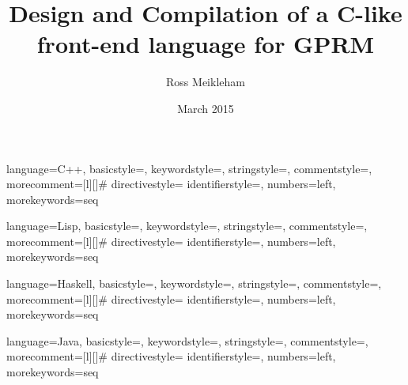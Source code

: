 \documentclass{l4proj}
\begin{document}
 {language=C++,
                basicstyle=\ttfamily,
                keywordstyle=\color{blue}\ttfamily,
                stringstyle=\color{red}\ttfamily,
                commentstyle=\color{gray}\ttfamily,
                morecomment=[l][\color{magenta}]{\#}
                directivestyle={\color{green}}
                identifierstyle=\color{purple},
                numbers=left,
                morekeywords={seq}
}


 {language=Lisp,
                basicstyle=\ttfamily,
                keywordstyle=\color{blue}\ttfamily,
                stringstyle=\color{red}\ttfamily,
                commentstyle=\color{gray}\ttfamily,
                morecomment=[l][\color{magenta}]{\#}
                directivestyle={\color{green}}
                identifierstyle=\color{purple},
                numbers=left,
                morekeywords={seq}
}

 {language=Haskell,
                basicstyle=\ttfamily,
                keywordstyle=\color{blue}\ttfamily,
                stringstyle=\color{red}\ttfamily,
                commentstyle=\color{gray}\ttfamily,
                morecomment=[l][\color{magenta}]{\#}
                directivestyle={\color{green}}
                identifierstyle=\color{purple},
                numbers=left,
                morekeywords={seq}
}

 {language=Java,
                basicstyle=\ttfamily,
                keywordstyle=\color{blue}\ttfamily,
                stringstyle=\color{red}\ttfamily,
                commentstyle=\color{gray}\ttfamily,
                morecomment=[l][\color{magenta}]{\#}
                directivestyle={\color{green}}
                identifierstyle=\color{purple},
                numbers=left,
                morekeywords={seq}
}

\title{Design and Compilation of a C-like front-end language for GPRM}
\author{Ross Meikleham}
\date{March 2015}
\maketitle


\begin{abstract}

\end{abstract}

\educationalconsent

\tableofcontents

\setlength{\parindent}{0pt}








\begin{appendices}
\end{appendices}




\end{document}
